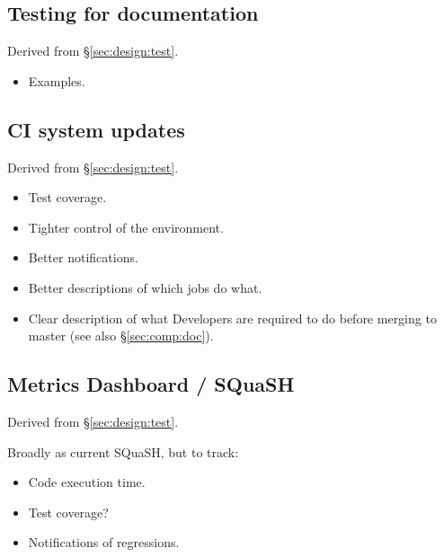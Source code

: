 \subsection{Testing for documentation}

Derived from \S\ref{sec:design:test}.


\begin{itemize}

  \item{Examples.}

\end{itemize}

\subsection{CI system updates}

Derived from \S\ref{sec:design:test}.


\begin{itemize}

  \item{Test coverage.}
  \item{Tighter control of the environment.}
  \item{Better notifications.}
  \item{Better descriptions of which jobs do what.}
  \item{Clear description of what Developers are required to do before merging
  to master (see also \S\ref{sec:comp:doc}).}

\end{itemize}


\subsection{Metrics Dashboard / SQuaSH}

Derived from \S\ref{sec:design:test}.


Broadly as current SQuaSH, but to track:

\begin{itemize}

  \item{Code execution time.}
  \item{Test coverage?}
  \item{Notifications of regressions.}

\end{itemize}

